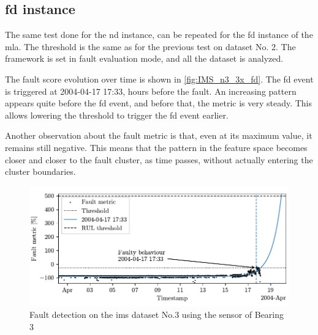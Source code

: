 \subsection{\gls{fd} instance}

The same test done for the \gls{nd} instance, can be repeated for the \gls{fd} instance of the \gls{mla}. The threshold is the same as for the previous test on dataset No. 2. The framework is set in fault evaluation mode, and all the dataset is analyzed. 

The fault score evolution over time is shown in \autoref{fig:IMS_n3_3x_fd}. 
The \gls{fd} event is triggered at 2004-04-17 17:33, hours before the fault.
An increasing pattern appears quite before the \gls{fd} event, and before that, the metric is very steady. This allows lowering the threshold to trigger the \gls{fd} event earlier.

Another observation about the fault metric is that, even at its maximum value, it remains still negative. This means that the pattern in the feature space becomes closer and closer to the fault cluster, as time passes, without actually entering the cluster boundaries.

\begin{figure}
    \centering
    \includegraphics{images/IMS/Test03/FD.pdf}
    \caption{Fault detection on the \gls{ims} dataset No.3 using the sensor of Bearing 3}
    \label{fig:IMS_n3_3x_fd}
\end{figure}